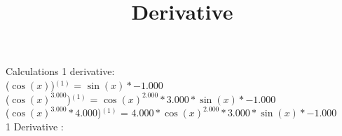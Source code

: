 \documentclass[a4paper, 12pt]{article}
\title{Derivative}
\begin{document}
\maketitle 
Calculations 1 derivative:\\ 
($\cos{(x)}$)$^{(1)}$ = $\sin{(x)}*{-1.000}$\\ 
($\cos{(x)}^{3.000}$)$^{(1)}$ = $\cos{(x)}^{2.000}*{3.000}*\sin{(x)}*{-1.000}$\\ 
($\cos{(x)}^{3.000}*{4.000}$)$^{(1)}$ = ${4.000}*\cos{(x)}^{2.000}*{3.000}*\sin{(x)}*{-1.000}$\\ 
1 Derivative : \\ 
\end{document}
